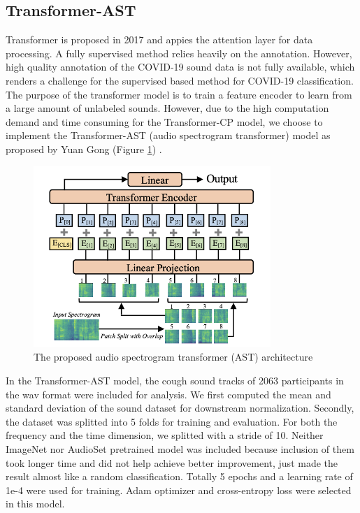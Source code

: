 \documentclass[11pt]{article}
\begin{document}
\subsection{Transformer-AST}

Transformer is proposed in 2017 and appies the attention layer for data processing. A fully supervised method relies heavily on the annotation. However, high quality annotation of the COVID-19 sound data is not fully available, which renders a challenge for the supervised based method for COVID-19 classification. The purpose of the transformer model is to train a feature encoder to learn from a large amount of unlabeled sounds. However, due to the high computation demand and time consuming for the Transformer-CP model, we choose to implement the Transformer-AST (audio spectrogram transformer) model as proposed by Yuan Gong (Figure \ref{fig:transformer_ast}) \cite{gong2021psla}.  

\begin{figure}[htbp]{}
	\centering
    \includegraphics[width=0.8\textwidth]{./imgs/transformer_ast.png} %
    \caption{The proposed audio spectrogram transformer (AST) architecture \cite{gong2021psla}}
    \label{fig:transformer_ast}
\end{figure}

In the Transformer-AST model, the cough sound tracks of 2063 participants in the wav format were included for analysis. We first computed the mean and standard deviation of the sound dataset for downstream normalization. Secondly, the dataset was splitted into 5 folds for training and evaluation. For both the frequency and the time dimension, we splitted with a stride of 10. Neither ImageNet nor AudioSet pretrained model was included because inclusion of them took longer time and did not help achieve better improvement, just made the result almost like a random classification. Totally 5 epochs and a learning rate of 1e-4 were used for training. Adam optimizer and cross-entropy loss were selected in this model.
\end{document}
